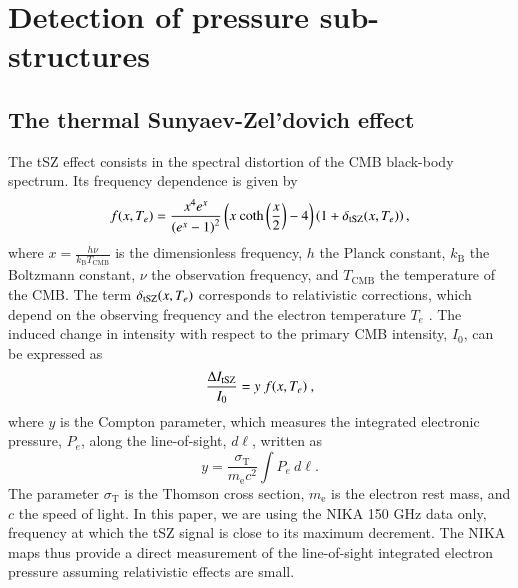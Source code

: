 \documentclass[twocolumn,traditabstract]{aa}
\begin{document}
\section{Detection of pressure sub-structures}\label{sec:Pressure_substructures_detection}
\subsection{The thermal Sunyaev-Zel'dovich effect}
The tSZ effect consists in the spectral distortion of the CMB black-body spectrum. Its frequency dependence is given by \citep{birkinshaw1999}
\begin{equation}
	f(x, T_e) = \frac{x^4 e^x}{\left(e^x-1\right)^2} \left(x  \ \mathrm{coth}\left(\frac{x}{2}\right) - 4\right) \left( 1 + \delta_{\rm tSZ}(x, T_e) \right), 
	\label{eq:sz_f_x}
\end{equation}
where $x = \frac{h \nu}{k_{\mathrm{B}} T_{\mathrm{CMB}}}$ is the dimensionless frequency, $h$ the Planck constant, $k_{\mathrm{B}}$ the Boltzmann constant, $\nu$ the observation frequency, and $T_{\mathrm{CMB}}$ the temperature of the CMB. The term $\delta_{\rm tSZ}(x,T_e)$ corresponds to relativistic corrections, which depend on the observing frequency and the electron temperature $T_e$ \citep[see, e.g.,][]{Itoh2003}. The induced change in intensity with respect to the primary CMB intensity, $I_0$, can be expressed as
\begin{equation}
	\frac{\Delta I_{\rm tSZ}}{I_0} = y \ f(x, T_e) \ ,
\label{eq:deltaI}
\end{equation}
where $y$ is the Compton parameter, which measures the integrated electronic pressure, $P_{e}$, along the line-of-sight, $d\ell$, written as
   \begin{equation}
	y = \frac{\sigma_{\mathrm{T}}}{m_{\mathrm{e}} c^2} \int P_{e} \ d\ell.
	\label{eq:y_compton}
   \end{equation}
The parameter $\sigma_{\mathrm{T}}$ is the Thomson cross section, $m_{\mathrm{e}}$ is the electron rest mass, and $c$ the speed of light. In this paper, we are using the NIKA 150 GHz data only, frequency at which the tSZ signal is close to its maximum decrement. The NIKA maps thus provide a direct measurement of the line-of-sight integrated electron pressure assuming relativistic effects are small.
\end{document}
